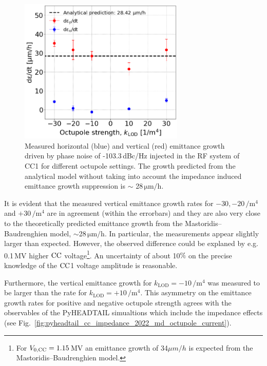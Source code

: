 \begin{figure}[!h]
   \centering         
   \includegraphics[width=0.7\textwidth]{images/Ch8/summary_md_12sep22_x_vs_y_backg_subtracted.png}
       \caption{Measured horizontal (blue) and vertical (red) emittance growth driven by phase noise of -103.3\,dBc/Hz injected in the RF system of CC1 for different octupole settings. The growth predicted from the analytical model without taking into account the impedance induced emittance growth suppression is $\sim$ 28\,$\mathrm{\mu m/h}$.}
       \label{fig:H_V_emit_growth_background_subtracted_octupole_scan_sep22}
\end{figure}

It is evident that the measured vertical emittance growth rates for $-30, -20$\,$\mathrm{/m^4}$ and $+30$\,$\mathrm{/m^4}$ are in agreement (within the errorbars) and they are also very close to the theoretically predicted emittance growth from the Mastoridis--Baudrenghien model, $\sim$28\,$\mathrm{\mu m /h}$. In particular, the measurements appear slightly larger than expected. However, the observed difference could be explaned by e.g. 0.1\,MV higher ${\mathrm{CC}}$ voltage\footnote{For ${V_\mathrm{0, CC}}=1.15$\,MV an emittance growth of 34$\mu m/h$ is expected from the Mastoridis--Baudrenghien model.}. An uncertainty of about 10$\%$ on the precise knowledge of the ${\mathrm{CC}}$1 voltage amplitude is reasonable.

Furthermore, the vertical emittance growth for $k_\mathrm{LOD}=-10$\,$\mathrm{/m^4}$ was measured to be larger than the rate for $k_\mathrm{LOD}=+10$\,$\mathrm{/m^4}$. This asymmetry on the emittance growth rates for positive and negative octupole strength agrees with the observables of the PyHEADTAIL simualtions which include the impedance effects (see Fig.~\ref{fig:pyheadtail_cc_impedance_2022_md_octupole_current}).

